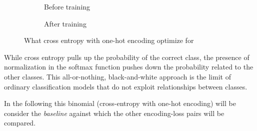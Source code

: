 \begin{figure}[htbp]
  \centering
  \begin{subfigure}{0.45\textwidth}
    \centering
    \begin{minipage}{\textwidth}
      \resizebox{\linewidth}{!}{}
    \end{minipage}
    \caption{Before training}
    \label{fig:03/xe-onehot-before}
  \end{subfigure}
  \begin{subfigure}{0.45\textwidth}
    \centering
    \begin{minipage}{\textwidth}
      \resizebox{\linewidth}{!}{}
    \end{minipage}
    \caption{After training}
    \label{fig:03/xe-onehot-after}
  \end{subfigure}
  \caption{What cross entropy with one-hot encoding optimize for}
\end{figure}

While cross entropy pulls up the probability of the correct class, the presence
of normalization in the softmax function pushes down the probability related to
the other classes. This all-or-nothing, black-and-white approach is the limit of
ordinary classification models that do not exploit relationships between
classes.

In the following this binomial (cross-entropy with one-hot encoding) will be
consider the \emph{baseline} against which the other encoding-loss pairs will be
compared.

